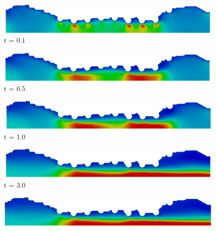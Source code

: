 \vspace{2cm}
\begin{figure}[H]
     \begin{minipage}{.50\linewidth}
      \centering
      \includegraphics[scale=0.12]{./02_chaps/cap_solution/figure/vel_RealStrut200.png}\\
      t = 0.1
     \end{minipage}%
     \begin{minipage}{.50\linewidth}
      \centering
      \includegraphics[scale=0.12]{./02_chaps/cap_solution/figure/vel_RealStrut1000.png}\\
      t = 0.5
     \end{minipage}
     \begin{minipage}{.50\linewidth}
     \medskip
      \centering
      \includegraphics[scale=0.12]{./02_chaps/cap_solution/figure/vel_RealStrut2000.png}\\
      t = 1.0
     \end{minipage}%
     \begin{minipage}{.50\linewidth}
     \medskip
      \centering
      \includegraphics[scale=0.12]{./02_chaps/cap_solution/figure/vel_RealStrut6000.png}\\
      t = 3.0
     \end{minipage}
     \begin{minipage}{.50\linewidth}
      \centering
      \includegraphics[scale=0.12]{./02_chaps/cap_solution/figure/vel_RealStrut8000.png}\\

\end{minipage}
\end{figure}
